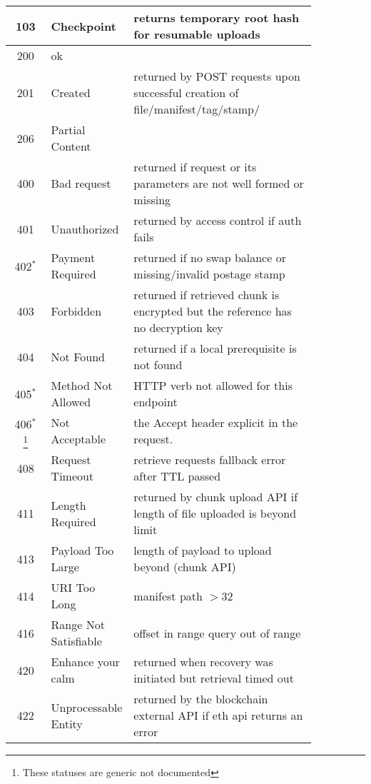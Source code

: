 \begin{definition}
\begin{lstlisting}
\end{lstlisting}
\begin{tabular}{c|p{0.25\linewidth}|p{0.6\linewidth}}
103 & Checkpoint & returns temporary root hash for resumable uploads
\\\hline
200 & ok &
\\
201 & Created & returned by POST requests upon successful creation of file/manifest/tag/stamp/
\\
206 & Partial Content &
\\\hline
400 & Bad request & returned if request or its parameters are not well formed or missing
\\
401 & Unauthorized & returned by access control if auth fails
\\
402$^{*}$ & Payment Required & returned if no swap balance or missing/invalid postage stamp
\\
403 & Forbidden & returned if retrieved chunk is encrypted  but the reference has no decryption key
\\     
404 & Not Found &
returned if a local prerequisite is not found
\\
405$^{*}$& Method Not Allowed & HTTP verb  not allowed for this endpoint
\\
406$^{*}$
\footnote[*]{These statuses are generic not documented}
%
& Not Acceptable &
the Accept header explicit in the request. 
\\
408 & Request Timeout & retrieve requests fallback error after TTL passed
\\
411 & Length Required & returned by chunk upload API if length of file uploaded is beyond limit
\\
413 & Payload Too Large  &
length of payload to upload beyond (chunk API)
\\
414 & URI Too Long  & manifest path  $>32 $
\\
416 & Range Not Satisfiable  & offset in range query out of range
\\
420 & Enhance your calm & returned when recovery was initiated but retrieval timed out
\\
422 & Unprocessable Entity & returned by the blockchain external API if eth api returns an error 
\end{tabular}
\end{definition}


